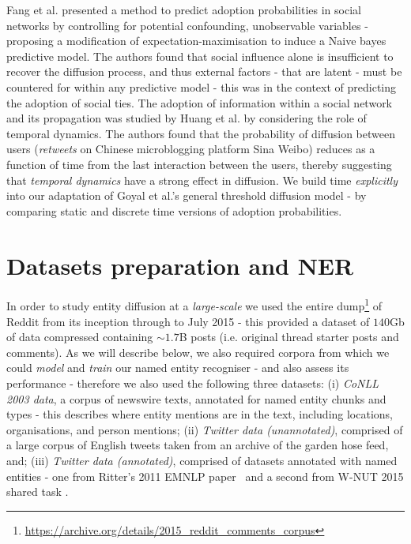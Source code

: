 \documentclass[review]{elsarticle}
\begin{document}
Fang et al. \cite{fang2013predicting} presented a method to predict adoption probabilities in social networks by controlling for potential confounding, unobservable variables - proposing a modification of expectation-maximisation to induce a Naive bayes predictive model.
The authors found that social influence alone is insufficient to recover the diffusion process, and thus external factors - that are latent - must be countered for within any predictive model - this was in the context of predicting the adoption of social ties.
The adoption of information within a social network and its propagation was studied by Huang et al. \cite{huang2014temporal} by considering the role of temporal dynamics.
The authors found that the probability of diffusion between users (\emph{retweets} on Chinese microblogging platform Sina Weibo) reduces as a function of time from the last interaction between the users, thereby suggesting that \emph{temporal dynamics} have a strong effect in diffusion.
We build time \emph{explicitly} into our adaptation of Goyal et al.'s \cite{goyal2010learning} general threshold diffusion model - by comparing static and discrete time versions of adoption probabilities.



%


\section{Datasets preparation and NER}
\label{sec:datasets_ner} 
In order to study entity diffusion at a \emph{large-scale} we used the entire dump\footnote{\url{https://archive.org/details/2015_reddit_comments_corpus}} of Reddit from its inception through to July 2015 - this provided a dataset of $140$Gb of data compressed containing $\sim1.7$B posts (i.e. original thread starter posts and comments).
As we will describe below, we also required corpora from which we could \emph{model} and \emph{train} our named entity recogniser - and also assess its performance - therefore we also used the following three datasets:
(i) \emph{CoNLL 2003 data}, a corpus of newswire texts, annotated for named entity chunks and types - this describes where entity mentions are in the text, including locations, organisations, and person mentions; 
(ii) \emph{Twitter data (unannotated)}, comprised of a large corpus of English tweets taken from an archive of the garden hose feed, and; 
(iii) \emph{Twitter data (annotated)}, comprised of datasets annotated with named entities - one from Ritter's 2011 EMNLP paper~\cite{ritter2011named} and a second from W-NUT 2015 shared task \cite{baldwin2015shared}.
\end{document}
